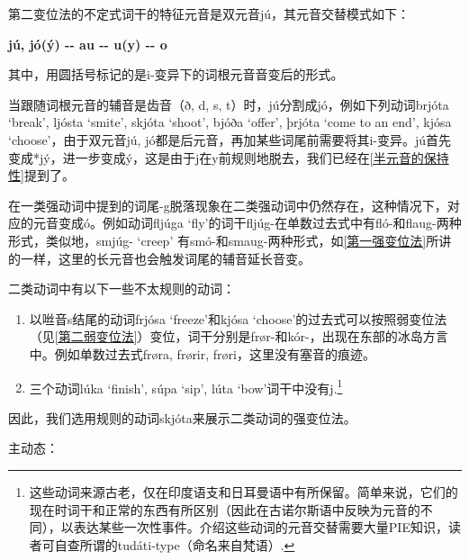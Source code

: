 第二变位法的不定式词干的特征元音是双元音jú，其元音交替模式如下：

\textbf{jú, jó(ý) -\/- au -\/- u(y) -\/- o}

其中，用圆括号标记的是i-变异下的词根元音音变后的形式。

当跟随词根元音的辅音是齿音（ð, d, s,
t）时，jú分割成jó，例如下列动词brjóta `break‌', ljósta `smite‌', skjóta
`shoot‌', bjóða `offer‌', þrjóta `come to an end‌', kjósa
`choose‌'，由于双元音jú,
jó都是后元音，再加某些词尾前需要将其i-变异。jú首先变成*jý，进一步变成ý，这是由于j在y前规则地脱去，我们已经在\ref{半元音的保持性}提到了。

在一类强动词中提到的词尾-g脱落现象在二类强动词中仍然存在，这种情况下，对应的元音变成ó。例如动词fljúga
`fly‌'的词干fljúg-在单数过去式中有fló-和flaug-两种形式，类似地，smjúg-
`creep‌'
有smó-和smaug-两种形式，如\ref{第一强变位法}所讲的一样，这里的长元音也会触发词尾的辅音延长音变。

二类动词中有以下一些不太规则的动词：

\begin{enumerate}
  \def\labelenumi{\arabic{enumi})}
  \item
        以咝音s结尾的动词frjósa `freeze‌'和kjósa
        `choose‌'的过去式可以按照弱变位法（见\ref{第二弱变位法}）变位，词干分别是frør-和kór-，出现在东部的冰岛方言中。例如单数过去式frøra,
        frørir, frøri，这里没有塞音的痕迹。
  \item
        三个动词lúka `finish‌', súpa `sip‌', lúta `bow‌'词干中没有j.\footnote{这些动词来源古老，仅在印度语支和日耳曼语中有所保留。简单来说，它们的现在时词干和正常的东西有所区别（因此在古诺尔斯语中反映为元音的不同），以表达某些一次性事件。介绍这些动词的元音交替需要大量PIE知识，读者可自查所谓的tudáti-type（命名来自梵语）.}
\end{enumerate}

因此，我们选用规则的动词skjóta来展示二类动词的强变位法。

主动态：

